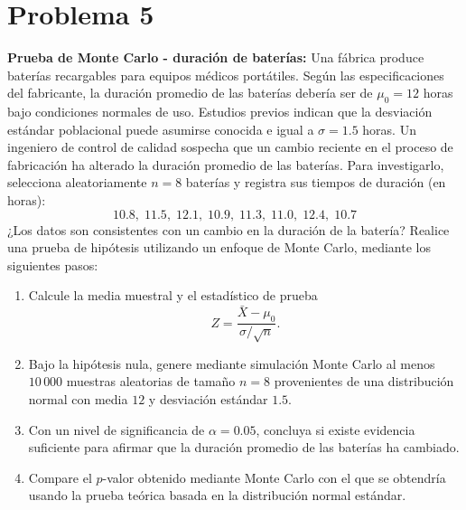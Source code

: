 \documentclass[12pt]{article}
\begin{document}
\section{Problema 5}
\textbf{Prueba de Monte Carlo - duración de baterías:} Una fábrica produce baterías recargables para equipos médicos portátiles. Según las especificaciones del fabricante, la duración promedio de las baterías debería ser de $\mu_0 = 12$ horas bajo condiciones normales de uso. Estudios previos indican que la desviación estándar poblacional puede asumirse conocida e igual a $\sigma = 1.5$ horas. Un ingeniero de control de calidad sospecha que un cambio reciente en el proceso de fabricación ha alterado la duración promedio de las baterías. Para investigarlo, selecciona aleatoriamente $n = 8$ baterías y registra sus tiempos de duración (en horas):
\[10.8, \; 11.5, \; 12.1, \; 10.9, \; 11.3, \; 11.0, \; 12.4, \; 10.7\]¿Los datos son consistentes con un cambio en la duración de la batería? Realice una prueba de hipótesis utilizando un enfoque de Monte Carlo, mediante los siguientes pasos:\begin{enumerate}\item Calcule la media muestral y el estadístico de prueba\[Z = \frac{\bar{X} - \mu_0}{\sigma / \sqrt{n}}.\]\item Bajo la hipótesis nula, genere mediante simulación Monte Carlo al menos $10\,000$ muestras aleatorias de tamaño $n = 8$ provenientes de una distribución normal con media $12$ y desviación estándar $1.5$.\item Con un nivel de significancia de $\alpha = 0.05$, concluya si existe evidencia suficiente para afirmar que la duración promedio de las baterías ha cambiado.\item Compare el $p$-valor obtenido mediante Monte Carlo con el que se obtendría usando la prueba teórica basada en la distribución normal estándar.\end{enumerate}
\end{document}
